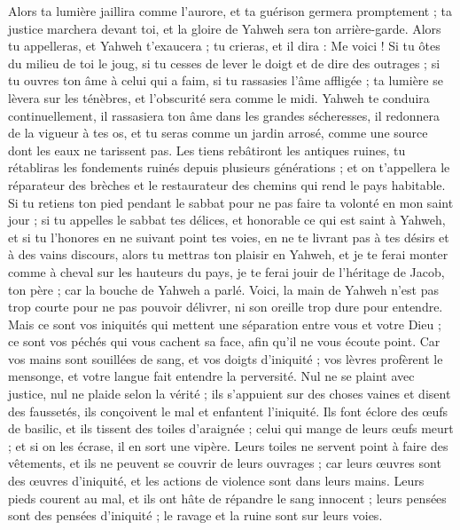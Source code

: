 \begin{multicols}{2}
Alors ta lumière jaillira comme l'aurore, et ta guérison germera promptement ; ta justice marchera devant toi, et la gloire de Yahweh sera ton arrière-garde.
Alors tu appelleras, et Yahweh t'exaucera ; tu crieras, et il dira : Me voici ! Si tu ôtes du milieu de toi le joug, si tu cesses de lever le doigt et de dire des outrages ;
si tu ouvres ton âme à celui qui a faim, si tu rassasies l'âme affligée ; ta lumière se lèvera sur les ténèbres, et l'obscurité sera comme le midi.
Yahweh te conduira continuellement, il rassasiera ton âme dans les grandes sécheresses, il redonnera de la vigueur à tes os, et tu seras comme un jardin arrosé, comme une source dont les eaux ne tarissent pas.
Les tiens rebâtiront les antiques ruines, tu rétabliras les fondements ruinés depuis plusieurs générations ; et on t'appellera le réparateur des brèches et le restaurateur des chemins qui rend le pays habitable.
Si tu retiens ton pied pendant le sabbat pour ne pas faire ta volonté en mon saint jour ; si tu appelles le sabbat tes délices, et honorable ce qui est saint à Yahweh, et si tu l'honores en ne suivant point tes voies, en ne te livrant pas à tes désirs et à des vains discours,
alors tu mettras ton plaisir en Yahweh, et je te ferai monter comme à cheval sur les hauteurs du pays, je te ferai jouir de l'héritage de Jacob, ton père ; car la bouche de Yahweh a parlé.
\VerseOne{}Voici, la main de Yahweh n'est pas trop courte pour ne pas pouvoir délivrer, ni son oreille trop dure pour entendre.
Mais ce sont vos iniquités qui mettent une séparation entre vous et votre Dieu ; ce sont vos péchés qui vous cachent sa face, afin qu'il ne vous écoute point.
Car vos mains sont souillées de sang, et vos doigts d'iniquité ; vos lèvres profèrent le mensonge, et votre langue fait entendre la perversité.
Nul ne se plaint avec justice, nul ne plaide selon la vérité ; ils s'appuient sur des choses vaines et disent des faussetés, ils conçoivent le mal et enfantent l'iniquité.
Ils font éclore des œufs de basilic, et ils tissent des toiles d'araignée ; celui qui mange de leurs œufs meurt ; et si on les écrase, il en sort une vipère.
Leurs toiles ne servent point à faire des vêtements, et ils ne peuvent se couvrir de leurs ouvrages ; car leurs œuvres sont des œuvres d'iniquité, et les actions de violence sont dans leurs mains.
Leurs pieds courent au mal, et ils ont hâte de répandre le sang innocent ; leurs pensées sont des pensées d'iniquité ; le ravage et la ruine sont sur leurs voies.

\end{multicols}
